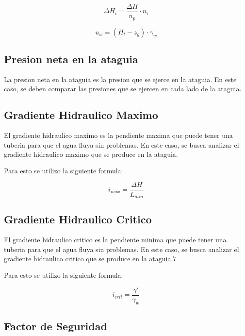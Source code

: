 \begin{equation}
    \Delta H_{i} = \frac{\Delta H}{n_{p}} \cdot n_{i}
\end{equation}

\begin{equation}
    u_{w} = (H_{t} - z_{g}) \cdot \gamma_{w}
\end{equation}

\subsection{Presion neta en la ataguia}

La presion neta en la ataguia es la presion que se ejerce en la ataguia. En este caso, se deben comparar las presiones que se ejercen en cada lado de la ataguia.

\subsection{Gradiente Hidraulico Maximo}

El gradiente hidraulico maximo es la pendiente maxima que puede tener una tuberia para que el agua fluya sin problemas. En este caso, se busca analizar el gradiente hidraulico maximo que se produce en la ataguia.

Para esto se utilizo la siguiente formula:

\begin{equation}
    i_{max} = \frac{\Delta H}{L_{min}}
\end{equation}

\subsection{Gradiente Hidraulico Critico}

El gradiente hidraulico critico es la pendiente minima que puede tener una tuberia para que el agua fluya sin problemas. En este caso, se busca analizar el gradiente hidraulico critico que se produce en la ataguia.7

Para esto se utilizo la siguiente formula:

\begin{equation}
    i_{crit} = \frac{\gamma '}{\gamma_{w}}
\end{equation}


\subsection{Factor de Seguridad}

